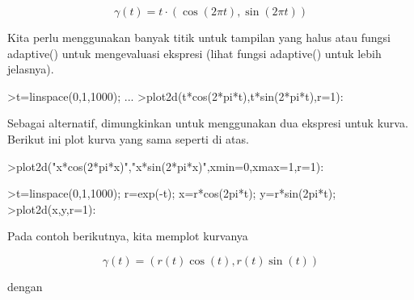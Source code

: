 \documentclass{article}
\begin{document}
\begin{eulernotebook}
\begin{eulercomment}
\begin{eulercomment}
\begin{eulercomment}
\begin{eulercomment}
\begin{eulercomment}
\begin{eulercomment}
\begin{eulercomment}
\begin{eulercomment}
\begin{eulercomment}
\begin{eulercomment}
\begin{eulercomment}
\begin{eulercomment}
\begin{eulercomment}
\end{eulercomment}
\begin{eulerformula}
\[
\gamma(t) = t \cdot (\cos(2\pi t),\sin(2\pi t))
\]
\end{eulerformula}
\begin{eulercomment}
Kita perlu menggunakan banyak titik untuk tampilan yang halus atau
fungsi adaptive() untuk mengevaluasi ekspresi (lihat fungsi adaptive()
untuk lebih jelasnya).
\end{eulercomment}
\begin{eulerprompt}
>t=linspace(0,1,1000); ...
>plot2d(t*cos(2*pi*t),t*sin(2*pi*t),r=1):
\end{eulerprompt}
\begin{eulercomment}
Sebagai alternatif, dimungkinkan untuk menggunakan dua ekspresi untuk
kurva. Berikut ini plot kurva yang sama seperti di atas.
\end{eulercomment}
\begin{eulerprompt}
>plot2d("x*cos(2*pi*x)","x*sin(2*pi*x)",xmin=0,xmax=1,r=1):
\end{eulerprompt}
\begin{eulerprompt}
>t=linspace(0,1,1000); r=exp(-t); x=r*cos(2pi*t); y=r*sin(2pi*t);
>plot2d(x,y,r=1):
\end{eulerprompt}
\begin{eulercomment}
Pada contoh berikutnya, kita memplot kurvanya

\end{eulercomment}
\begin{eulerformula}
\[
\gamma(t) = (r(t) \cos(t), r(t) \sin(t))
\]
\end{eulerformula}
\begin{eulercomment}
dengan


\end{eulercomment}
\end{eulercomment}
\end{eulercomment}
\end{eulercomment}
\end{eulercomment}
\end{eulercomment}
\end{eulercomment}
\end{eulercomment}
\end{eulercomment}
\end{eulercomment}
\end{eulercomment}
\end{eulercomment}
\end{eulercomment}
\end{eulernotebook}
\end{document}
